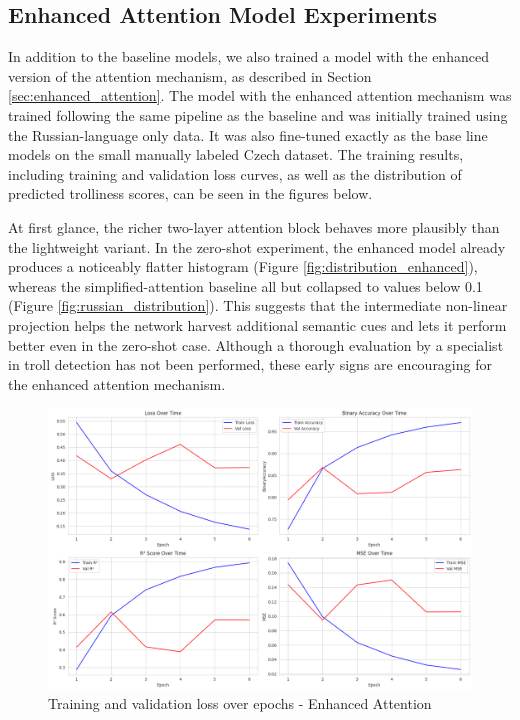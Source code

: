 \documentclass[twoside]{ctuthesis}
\theoremstyle{plain}
\theoremstyle{definition}
\theoremstyle{note}
\begin{document}
\subsection{Enhanced Attention Model Experiments}

In addition to the baseline models, we also trained a model with the enhanced version of the attention mechanism, as described in Section \ref{sec:enhanced_attention}. The model with the enhanced attention mechanism was trained following the same pipeline as the baseline and was initially trained using the Russian-language only data. It was also fine-tuned exactly as the base line models on the small manually labeled Czech dataset. The training results, including training and validation loss curves, as well as the distribution of predicted trolliness scores, can be seen in the figures below.\par 

At first glance, the richer two-layer attention block behaves more plausibly than the lightweight variant. In the zero-shot experiment, the enhanced model already produces a noticeably flatter histogram (Figure \ref{fig:distribution_enhanced}), whereas the simplified-attention baseline all but collapsed to values below 0.1 (Figure \ref{fig:russian_distribution}). This suggests that the intermediate non-linear projection helps the network harvest additional semantic cues and lets it perform better even in the zero-shot case. Although a thorough evaluation by a specialist in troll detection has not been performed, these early signs are encouraging for the enhanced attention mechanism.\par

\begin{figure}[htbp]
  \centering
  \includegraphics[scale=0.33]{figures/training_enhanced.png}
  \caption{Training and validation loss over epochs - Enhanced Attention}
  \label{fig:training_stats_enhanced}
\end{figure}
\end{document}
